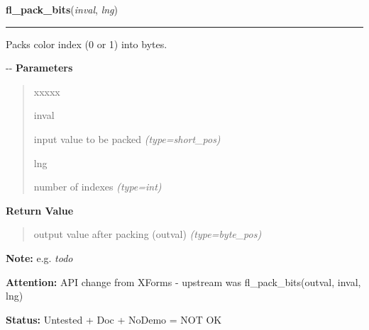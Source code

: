     \label{xformslib:flflimage:fl_pack_bits}

    \vspace{0.5ex}

\hspace{.8\funcindent}\begin{boxedminipage}{\funcwidth}

    \raggedright \textbf{fl\_pack\_bits}(\textit{inval}, \textit{lng})

    \vspace{-1.5ex}

    \rule{\textwidth}{0.5\fboxrule}
\setlength{\parskip}{2ex}

Packs color index (0 or 1) into bytes.

-{}-
\setlength{\parskip}{1ex}
      \textbf{Parameters}
      \vspace{-1ex}

      \begin{quote}
        \begin{Ventry}{xxxxx}

          \item[inval]


input value to be packed
            {\it (type=short\_pos)}

          \item[lng]


number of indexes
            {\it (type=int)}

        \end{Ventry}

      \end{quote}

      \textbf{Return Value}
    \vspace{-1ex}

      \begin{quote}

output value after packing (outval)
      {\it (type=byte\_pos)}

      \end{quote}

\textbf{Note:} 
e.g. \emph{todo}


\textbf{Attention:} 
API change from XForms - upstream was
fl\_pack\_bits(outval, inval, lng)


\textbf{Status:} 
Untested + Doc + NoDemo = NOT OK


    \end{boxedminipage}

